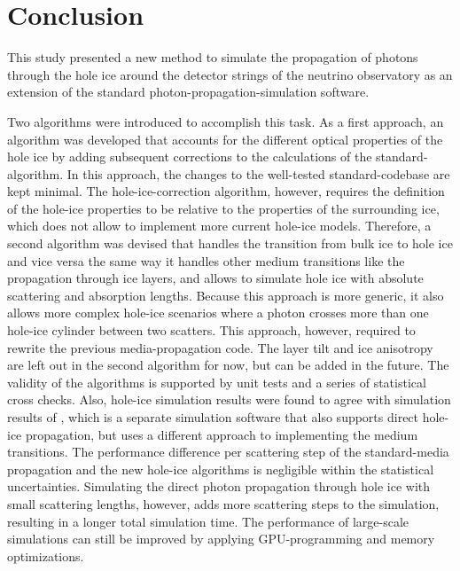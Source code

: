 
\section{Conclusion}
\label{sec:conclusion}

This study presented a new method to simulate the propagation of photons through the hole ice around the detector strings of the \icecube neutrino observatory as an extension of the standard \clsim photon-propagation-simulation software.

Two algorithms were introduced to accomplish this task.
As a first approach, an algorithm was developed that accounts for the different optical properties of the hole ice by adding subsequent corrections to the calculations of the standard-\clsim algorithm.
In this approach, the changes to the well-tested standard-\clsim codebase are kept minimal.
The hole-ice-correction algorithm, however, requires the definition of the hole-ice properties to be relative to the properties of the surrounding ice, which does not allow to implement more current hole-ice models.
Therefore, a second algorithm was devised that handles the transition from bulk ice to hole ice and vice versa the same way it handles other medium transitions like the propagation through ice layers, and allows to simulate hole ice with absolute scattering and absorption lengths.
Because this approach is more generic, it also allows more complex hole-ice scenarios where a photon crosses more than one hole-ice cylinder between two scatters.
This approach, however, required to rewrite the previous \clsim media-propagation code.
The layer tilt and ice anisotropy are left out in the second algorithm for now, but can be added in the future.
The validity of the algorithms is supported by unit tests and a series of statistical cross checks.
Also, \clsim hole-ice simulation results were found to agree with simulation results of \ppc, which is a separate \icecube simulation software that also supports direct hole-ice propagation, but uses a different approach to implementing the medium transitions.
The performance difference per scattering step of the standard-\clsim media propagation and the new hole-ice algorithms is negligible within the statistical uncertainties.
Simulating the direct photon propagation through hole ice with small scattering lengths, however, adds more scattering steps to the simulation, resulting in a longer total simulation time.
The performance of large-scale simulations can still be improved by applying GPU-programming and memory optimizations.

